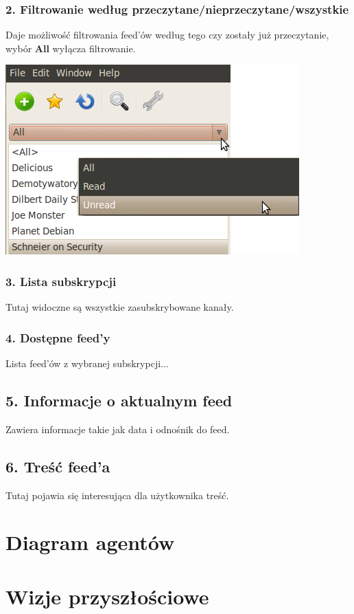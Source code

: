 \documentclass[a4paper,11pt]{report}
\begin{document}
\newpage
\subsubsection*{2. Filtrowanie według
przeczytane/nieprzeczytane/wszystkie}
Daje możliwość filtrowania feed'ów według tego czy zostały już przeczytanie,
wybór \textbf{All} wyłącza filtrowanie.

\includegraphics[scale=0.5]{./img/menu_readmenu1.png}

\subsubsection*{3. Lista subskrypcji}
Tutaj widoczne są wszystkie zasubskrybowane kanały.

\subsubsection*{4. Dostępne feed'y}
Lista feed'ów z wybranej subskrypcji...

\subsection{5. Informacje o aktualnym feed}
Zawiera informacje takie jak data i odnośnik do feed.

\subsection{6. Treść feed'a}
Tutaj pojawia się interesująca dla użytkownika treść.

\section{Diagram agentów}


\section{Wizje przyszłościowe}
\end{document}
